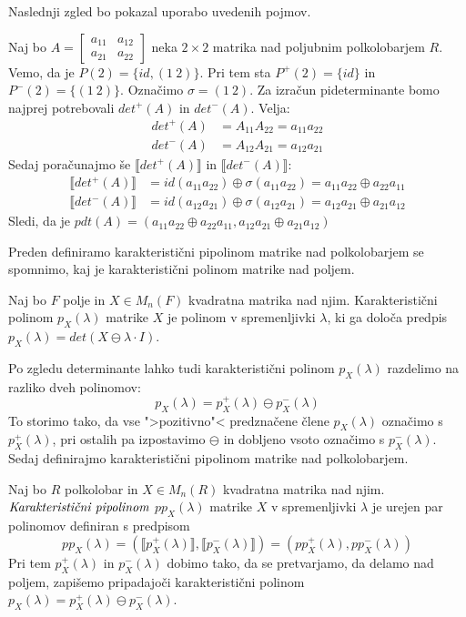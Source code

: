 \documentclass[mat1]{fmfdelo}
\newcommand{\pojem}[1]{\ensuremath{\emph{#1}}}
\begin{document}
Naslednji zgled bo pokazal uporabo uvedenih pojmov.
\begin{zgled}\label{zgled:matA1}
	Naj bo $A = \begin{bmatrix}
		a_{11} & a_{12} \\
		a_{21} & a_{22}
	\end{bmatrix}$ neka $2\times 2$ matrika nad poljubnim polkolobarjem $R$. Vemo, da je $P(2) = \{id, (1~2)\}$. Pri tem sta $P^{+}(2) = \{id\}$ in $P^{-}(2) = \{(1~2)\}$. Označimo $\sigma = (1~2)$.
	Za izračun pideterminante bomo najprej potrebovali $det^{+}(A)$ in $det^{-}(A)$. Velja: \begin{align*}
		det^{+}(A) &= A_{11}A_{22} = a_{11}a_{22} \\
		det^{-}(A) &= A_{12}A_{21} = a_{12}a_{21}
	\end{align*}
	Sedaj poračunajmo še $\llbracket det^{+}(A) \rrbracket$ in $\llbracket det^{-}(A) \rrbracket$:
	\begin{align*}
		\llbracket det^{+}(A) \rrbracket &= id(a_{11}a_{22}) \oplus \sigma(a_{11}a_{22}) = a_{11}a_{22} \oplus a_{22}a_{11} \\
		\llbracket det^{-}(A) \rrbracket &= id(a_{12}a_{21}) \oplus \sigma(a_{12}a_{21}) = a_{12}a_{21} \oplus a_{21}a_{12}
	\end{align*}
	Sledi, da je $pdt(A) = (a_{11}a_{22} \oplus a_{22}a_{11}, a_{12}a_{21} \oplus a_{21}a_{12})$
\end{zgled}


Preden definiramo karakteristični pipolinom matrike nad polkolobarjem se spomnimo, kaj je karakteristični polinom matrike nad poljem.

\begin{definicija}
	Naj bo $F$ polje in $X\in M_n(F)$ kvadratna matrika nad njim. Karakteristični polinom $p_X(\lambda)$ matrike $X$ je polinom v spremenljivki $\lambda$, ki ga določa predpis $p_X(\lambda) = det(X \ominus \lambda\cdot I)$.
\end{definicija}
 
 Po zgledu determinante lahko tudi karakteristični polinom $p_X(\lambda)$ razdelimo na razliko dveh polinomov: $$p_X(\lambda) = p_X^{+}(\lambda) \ominus p_X^{-}(\lambda)$$
 To storimo tako, da vse ">pozitivno"< predznačene člene $p_X(\lambda)$ označimo s $p_X^{+}(\lambda)$, pri ostalih pa izpostavimo $\ominus$ in dobljeno vsoto označimo s $p_X^{-}(\lambda)$.
 Sedaj definirajmo karakteristični pipolinom matrike nad polkolobarjem.

\begin{definicija}
	Naj bo $R$ polkolobar in $X\in M_n(R)$ kvadratna matrika nad njim. \pojem{Karakteristični pipolinom} $pp_X(\lambda)$ matrike $X$ v spremenljivki $\lambda$ je urejen par polinomov definiran s predpisom $$pp_X(\lambda) = (\llbracket p_X^{+}(\lambda)\rrbracket, \llbracket p_X^{-}(\lambda)\rrbracket) = (pp_X^{+}(\lambda), pp_X^{-}(\lambda))$$
	Pri tem $p_X^{+}(\lambda)$ in $p_X^{-}(\lambda)$ dobimo tako, da se pretvarjamo, da delamo nad poljem, zapišemo pripadajoči karakteristični polinom $p_X(\lambda) = p_X^{+}(\lambda) \ominus p_X^{-}(\lambda)$.
\end{definicija}
\end{document}

